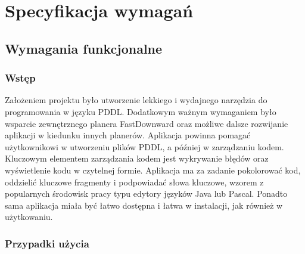 \chapter{Specyfikacja wymagań}
\label{sec:specyfikacja}
\section{Wymagania funkcjonalne}
\subsection{Wstęp}
Założeniem projektu było utworzenie lekkiego i wydajnego narzędzia do programowania w języku PDDL. Dodatkowym ważnym wymaganiem było wsparcie zewnętrznego planera FastDownward oraz możliwe dalsze rozwijanie aplikacji w kiedunku innych planerów. Aplikacja powinna pomagać użytkownikowi w utworzeniu plików PDDL, a później w zarządzaniu kodem. Kluczowym elementem zarządzania kodem jest wykrywanie błędów oraz wyświetlenie kodu w czytelnej formie. Aplikacja ma za zadanie pokolorować kod, oddzielić kluczowe fragmenty i podpowiadać słowa kluczowe, wzorem z popularnych środowisk pracy typu edytory języków Java lub Pascal. Ponadto sama aplikacja miała być łatwo dostępna i łatwa w instalacji, jak również w użytkowaniu.
\subsection{Przypadki użycia}
